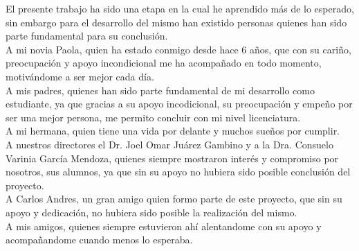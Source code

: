 \begin{tcolorbox}[adjusted title=flush center,halign title=flush center,titlerule=3mm,title= \large{Luis D. Meza M.}] 
El presente trabajo ha sido una etapa en la cual he aprendido más de lo esperado, sin embargo para el desarrollo del mismo han existido personas quienes han sido parte fundamental para su conclusión.
\\
A mi novia Paola, quien ha estado conmigo desde hace 6 años, que con su cariño, preocupación y apoyo incondicional me ha acompañado en todo momento, motivándome a ser mejor cada día. 
\\
A mis padres, quienes han sido parte fundamental de mi desarrollo como estudiante, ya que gracias a  su apoyo incodicional, su preocupación y empeño por ser una mejor persona, me permito concluir con mi nivel licenciatura.
\\
A mi hermana, quien tiene una vida por delante y muchos sueños por cumplir.
\\
A nuestros directores el Dr. Joel Omar Juárez Gambino y a la Dra. Consuelo Varinia García Mendoza, quienes siempre mostraron interés y compromiso por nosotros, sus alumnos, ya que sin su apoyo no hubiera sido posible conclusión del proyecto.
\\
A Carlos Andres, un gran amigo quien formo parte de este proyecto, que sin su apoyo y dedicación, no hubiera sido posible la realización del mismo.
\\
A mis amigos, quienes siempre estuvieron ahí alentandome con su apoyo y acompañandome cuando menos lo esperaba.
\end{tcolorbox}

